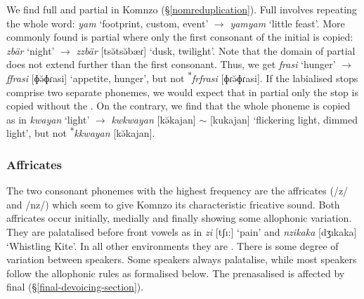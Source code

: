 We find full and partial  in Komnzo (\S{}\ref{nomreduplication}). Full  involves repeating the whole word: \emph{yam} `footprint, custom, event' $\rightarrow$ \emph{yamyam} `little feast'. More commonly found is partial  where only the first consonant of the initial  is copied: \emph{zbär} `night' $\rightarrow$ \emph{zzbär} [tsə̆tsə̆bæɾ] `dusk, twilight'. Note that the domain of partial  does not extend further than the first consonant. Thus, we get \emph{frasi} `hunger' $\rightarrow$ \emph{ffrasi} [ɸə̆ɸɾasi] `appetite, hunger', but not \textsuperscript{$\ast$}\emph{frfrasi} [ɸɾə̆ɸɾasi]. If the labialised  stops comprise two separate phonemes, we would expect that in partial  only the  stop is copied without the . On the contrary, we find that the whole phoneme is copied as in \emph{kwayan} `light' $\rightarrow$ \emph{kwkwayan} [kə̆kajan] $\sim$ [kukajan] `flickering light, dimmed light', but not \textsuperscript{$\ast$}\emph{kkwayan} [kə̆kajan].%

\subsubsection{Affricates} \label{affricates}

The two consonant phonemes with the highest frequency are the affricates (/z/ and /nz/) which seem to give Komnzo its characteristic fricative sound. Both affricates occur initially, medially and finally showing some allophonic variation. They are palatalised before front vowels as in \emph{zi} [tʃı:] `pain' and \emph{nzikaka} [dʒıkaka] `Whistling Kite'. In all other environments they are . There is some degree of variation between speakers. Some speakers always palatalise, while most speakers follow the allophonic rules as formalised below. The prenasalised  is affected by final  (\S{}\ref{final-devoicing-section}).%

